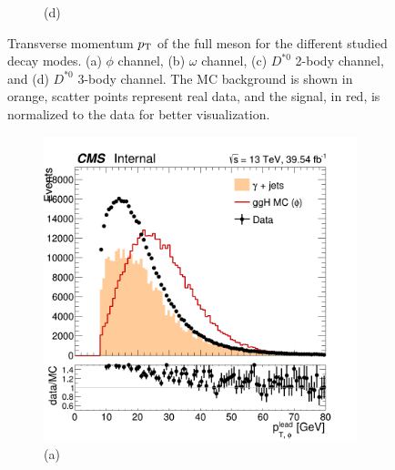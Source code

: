 \begin{figure}[!ht]
\begin{subfigure}[t]{0.50\mylength}
        \caption{\footnotesize (d)}
    \end{subfigure}%
\caption{Transverse momentum $p_\text{T}$ of the full meson for the different studied decay modes. (a) $\phi$ channel, (b) $\omega$ channel, (c) $D^{*0}$ 2-body channel, and (d) $D^{*0}$ 3-body channel. The MC background is shown in orange, scatter points represent real data, and the signal, in red, is normalized to the data for better visualization.}
\label{fig:full_pt_data}
    \vspace*{-0.0cm}
\end{figure}

\begin{figure}[!ht]
    \captionsetup[subfigure]{labelformat=empty}
    \vspace*{-0.2cm}
    \centering
    \setlength{\mylength}{\textwidth}
    \begin{subfigure}[t]{0.50\mylength}
        \centering
        \includegraphics[width=0.45\mylength]{resources/plots/Phi3_lead_pt.png}
        \caption{\footnotesize (a)}
    \end{subfigure}%
    \begin{subfigure}[t]{0.50\mylength}
        \centering

\end{subfigure}
\end{figure}
